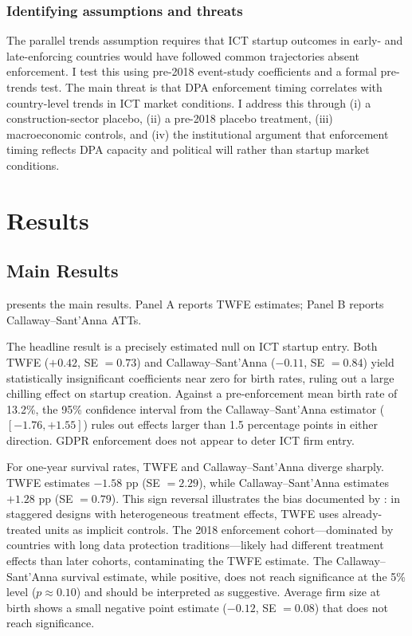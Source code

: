 \documentclass[12pt]{article}
\begin{document}
\subsubsection*{Identifying assumptions and threats} The parallel trends assumption requires that ICT startup outcomes in early- and late-enforcing countries would have followed common trajectories absent enforcement. I test this using pre-2018 event-study coefficients and a formal pre-trends test. The main threat is that DPA enforcement timing correlates with country-level trends in ICT market conditions. I address this through (i) a construction-sector placebo, (ii) a pre-2018 placebo treatment, (iii) macroeconomic controls, and (iv) the institutional argument that enforcement timing reflects DPA capacity and political will rather than startup market conditions.

\section{Results}

\subsection{Main Results}



 presents the main results. Panel A reports TWFE estimates; Panel B reports Callaway--Sant'Anna ATTs.

The headline result is a precisely estimated null on ICT startup entry. Both TWFE ($+0.42$, SE $= 0.73$) and Callaway--Sant'Anna ($-0.11$, SE $= 0.84$) yield statistically insignificant coefficients near zero for birth rates, ruling out a large chilling effect on startup creation. Against a pre-enforcement mean birth rate of 13.2\%, the 95\% confidence interval from the Callaway--Sant'Anna estimator ($[-1.76, +1.55]$) rules out effects larger than 1.5 percentage points in either direction. GDPR enforcement does not appear to deter ICT firm entry.

For one-year survival rates, TWFE and Callaway--Sant'Anna diverge sharply. TWFE estimates $-1.58$ pp (SE $= 2.29$), while Callaway--Sant'Anna estimates $+1.28$ pp (SE $= 0.79$). This sign reversal illustrates the bias documented by \citet{goodmanbacon2021}: in staggered designs with heterogeneous treatment effects, TWFE uses already-treated units as implicit controls. The 2018 enforcement cohort---dominated by countries with long data protection traditions---likely had different treatment effects than later cohorts, contaminating the TWFE estimate. The Callaway--Sant'Anna survival estimate, while positive, does not reach significance at the 5\% level ($p \approx 0.10$) and should be interpreted as suggestive. Average firm size at birth shows a small negative point estimate ($-0.12$, SE $= 0.08$) that does not reach significance.
\end{document}
